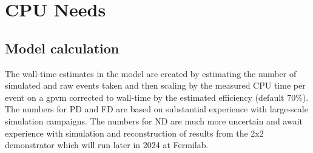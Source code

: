 \documentclass[12pt]{article}
\begin{document}
\clearpage
\section{CPU Needs}



\subsection{Model calculation}
The wall-time estimates in the model are created by estimating the number of simulated and raw events taken and then scaling by the measured CPU time per event on a gpvm corrected to wall-time by the estimated efficiency (default 70\%).
The numbers for PD and FD are based on substantial experience with large-scale simulation campaigns.  The numbers for ND are much more uncertain and await experience with  simulation and reconstruction of results from the 2x2 demonstrator which will run later in 2024 at Fermilab. 




\end{document}
